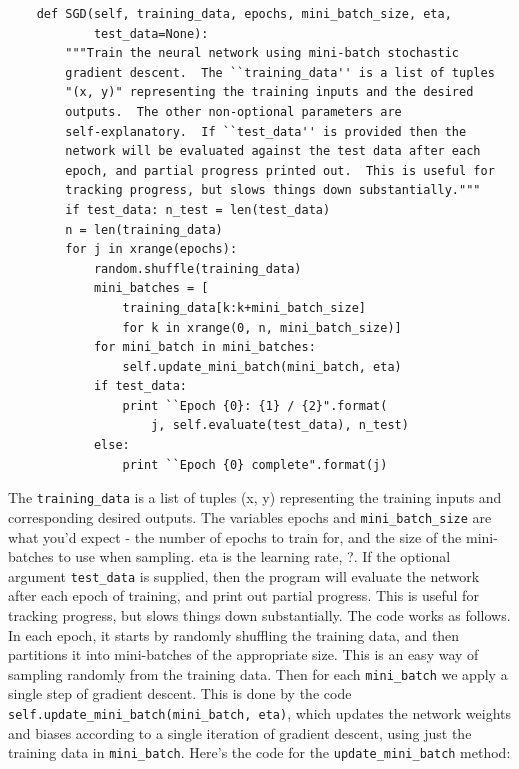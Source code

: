 \begin{lstlisting}
    def SGD(self, training_data, epochs, mini_batch_size, eta,
            test_data=None):
        """Train the neural network using mini-batch stochastic
        gradient descent.  The ``training_data'' is a list of tuples
        "(x, y)" representing the training inputs and the desired
        outputs.  The other non-optional parameters are
        self-explanatory.  If ``test_data'' is provided then the
        network will be evaluated against the test data after each
        epoch, and partial progress printed out.  This is useful for
        tracking progress, but slows things down substantially."""
        if test_data: n_test = len(test_data)
        n = len(training_data)
        for j in xrange(epochs):
            random.shuffle(training_data)
            mini_batches = [
                training_data[k:k+mini_batch_size]
                for k in xrange(0, n, mini_batch_size)]
            for mini_batch in mini_batches:
                self.update_mini_batch(mini_batch, eta)
            if test_data:
                print ``Epoch {0}: {1} / {2}".format(
                    j, self.evaluate(test_data), n_test)
            else:
                print ``Epoch {0} complete".format(j)
\end{lstlisting}
                
The \lstinline{training_data} is a list of tuples (x, y) representing the training inputs and corresponding desired outputs. The variables epochs and \lstinline{mini_batch_size} are what you'd expect - the number of epochs to train for, and the size of the mini-batches to use when sampling. eta is the learning rate, ?. If the optional argument \lstinline{test_data} is supplied, then the program will evaluate the network after each epoch of training, and print out partial progress. This is useful for tracking progress, but slows things down substantially.
The code works as follows. In each epoch, it starts by randomly shuffling the training data, and then partitions it into mini-batches of the appropriate size. This is an easy way of sampling randomly from the training data. Then for each \lstinline{mini_batch} we apply a single step of gradient descent. This is done by the code \lstinline{self.update_mini_batch(mini_batch, eta)}, which updates the network weights and biases according to a single iteration of gradient descent, using just the training data in \lstinline{mini_batch}. Here's the code for the \lstinline{update_mini_batch} method: 

